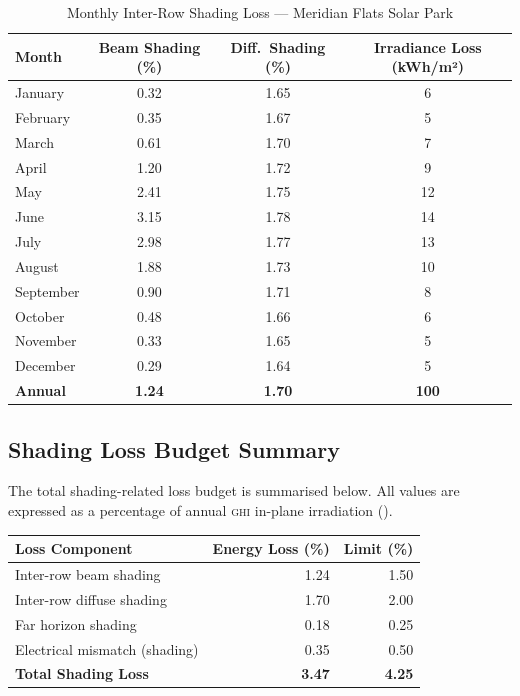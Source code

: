\begin{table}[H]
  \centering
  \caption{Monthly Inter-Row Shading Loss — Meridian Flats Solar Park}
  \label{tab:shading}
  \begin{tabular}{@{} l S[table-format=1.2] S[table-format=1.2] S[table-format=3.0] @{}}
    \toprule
    \textbf{Month} & \textbf{Beam Shading (\%)} & \textbf{Diff.\ Shading (\%)} & \textbf{Irradiance Loss (kWh/m²)} \\
    \midrule
    January   & 0.32 & 1.65 & 6 \\
    February  & 0.35 & 1.67 & 5 \\
    March     & 0.61 & 1.70 & 7 \\
    April     & 1.20 & 1.72 & 9 \\
    May       & 2.41 & 1.75 & 12 \\
    June      & 3.15 & 1.78 & 14 \\
    July      & 2.98 & 1.77 & 13 \\
    August    & 1.88 & 1.73 & 10 \\
    September & 0.90 & 1.71 & 8 \\
    October   & 0.48 & 1.66 & 6 \\
    November  & 0.33 & 1.65 & 5 \\
    December  & 0.29 & 1.64 & 5 \\
    \midrule
    \textbf{Annual} & \textbf{1.24} & \textbf{1.70} & \textbf{100} \\
    \bottomrule
  \end{tabular}
\end{table}

\subsection{Shading Loss Budget Summary}

The total shading-related loss budget is summarised below. All values are expressed as a
percentage of annual \textsc{ghi} in-plane irradiation ().

\begin{center}
\begin{tabular}{@{} l r r @{}}
  \toprule
  \rowcolor{SolarMist}
  \textbf{Loss Component}        & \textbf{Energy Loss (\%)} & \textbf{Limit (\%)} \\
  \midrule
  Inter-row beam shading         & 1.24  & 1.50 \\
  Inter-row diffuse shading      & 1.70  & 2.00 \\
  Far horizon shading            & 0.18  & 0.25 \\
  Electrical mismatch (shading)  & 0.35  & 0.50 \\
  \midrule
  \rowcolor{SolarMist}
  \textbf{Total Shading Loss}    & \textbf{3.47}  & \textbf{4.25} \\
  \bottomrule
\end{tabular}
\end{center}

